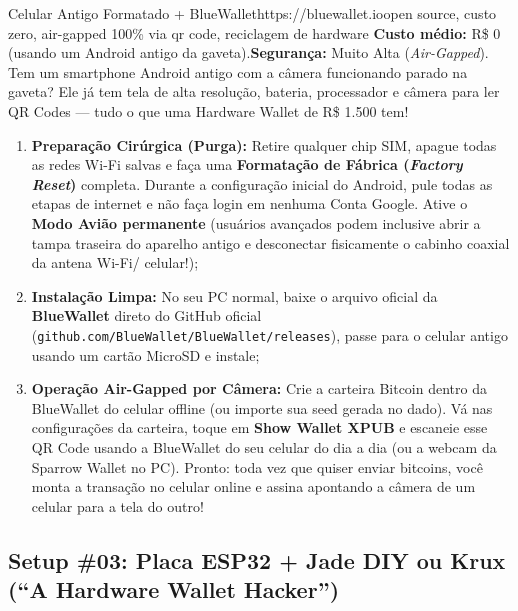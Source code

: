 \documentclass{pousadaguide}
\begin{document}
\begin{ferramenta}[goat,logo=bluewallet]{Celular Antigo Formatado + BlueWallet}{https://bluewallet.io}{open source, custo zero, air-gapped 100\% via qr code, reciclagem de hardware}
\textbf{Custo médio:} R\$ 0 (usando um Android antigo da gaveta).\quad \textbf{Segurança:} Muito Alta (\emph{Air-Gapped}).\\[1mm]
Tem um smartphone Android antigo com a câmera funcionando parado na gaveta? Ele já tem tela de alta resolução, bateria, processador e câmera para ler QR Codes — tudo o que uma Hardware Wallet de R\$ 1.500 tem!
\begin{enumerate}
  \item \textbf{Preparação Cirúrgica (Purga):} Retire qualquer chip SIM, apague todas as redes Wi-Fi salvas e faça uma \textbf{Formatação de Fábrica (\emph{Factory Reset})} completa. Durante a configuração inicial do Android, pule todas as etapas de internet e não faça login em nenhuma Conta Google. Ative o \textbf{Modo Avião permanente} (usuários avançados podem inclusive abrir a tampa traseira do aparelho antigo e desconectar fisicamente o cabinho coaxial da antena Wi-Fi/ celular!);
  \item \textbf{Instalação Limpa:} No seu PC normal, baixe o arquivo  oficial da \textbf{BlueWallet} direto do GitHub oficial (\texttt{github.com/BlueWallet/BlueWallet/releases}), passe para o celular antigo usando um cartão MicroSD e instale;
  \item \textbf{Operação Air-Gapped por Câmera:} Crie a carteira Bitcoin dentro da BlueWallet do celular offline (ou importe sua seed gerada no dado). Vá nas configurações da carteira, toque em \textbf{Show Wallet XPUB} e escaneie esse QR Code usando a BlueWallet do seu celular do dia a dia (ou a webcam da Sparrow Wallet no PC). Pronto: toda vez que quiser enviar bitcoins, você monta a transação no celular online e assina apontando a câmera de um celular para a tela do outro!
\end{enumerate}
\end{ferramenta}

\clearpage
\subsection{Setup \#03: Placa ESP32 + Jade DIY ou Krux (“A Hardware Wallet Hacker”)}
\end{document}
